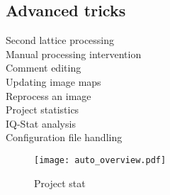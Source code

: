 \subsection{Advanced tricks}

\begin{description}
	\item [Second lattice processing]
	\item [Manual processing intervention] 
	\item [Comment editing]
	\item [Updating image maps]
	\item [Reprocess an image]
	\item [Project statistics]
	\item [IQ-Stat analysis]
	\item [Configuration file handling] 
\end{description}



\begin{figure}
	\centering
	\texttt{[image: auto\_overview.pdf]}
	\caption{Project stat}
	\label{fig:auto_stat}
\end{figure}